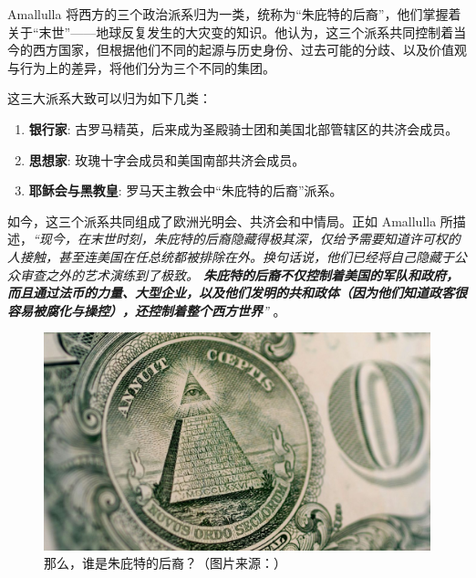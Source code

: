 \documentclass[10pt,twocolumn,letterpaper]{article}
\begin{document}
Amallulla 将西方的三个政治派系归为一类，统称为“朱庇特的后裔”，他们掌握着关于“末世”——地球反复发生的大灾变的知识。他认为，这三个派系共同控制着当今的西方国家，但根据他们不同的起源与历史身份、过去可能的分歧、以及价值观与行为上的差异，将他们分为三个不同的集团。

这三大派系大致可以归为如下几类：

\begin{flushleft}
\begin{enumerate}
    \item \textbf{银行家}: 古罗马精英，后来成为圣殿骑士团和美国北部管辖区的共济会成员。
    \item \textbf{思想家}: 玫瑰十字会成员和美国南部共济会成员。
    \item \textbf{耶稣会与黑教皇}: 罗马天主教会中“朱庇特的后裔”派系。
\end{enumerate}
\end{flushleft}

如今，这三个派系共同组成了欧洲光明会、共济会和中情局。正如 Amallulla 所描述，\textit{“现今，在末世时刻，朱庇特的后裔隐藏得极其深，仅给予需要知道许可权的人接触，甚至连美国在任总统都被排除在外。换句话说，他们已经将自己隐藏于公众审查之外的艺术演练到了极致。 \textbf{朱庇特的后裔不仅控制着美国的军队和政府，而且通过法币的力量、大型企业，以及他们发明的共和政体（因为他们知道政客很容易被腐化与操控），还控制着整个西方世界}”} \cite{33,34}。

\begin{figure}[h]
\begin{center}
   \includegraphics[width=1\linewidth]{illuminati.jpg}

\end{center}
   \caption{那么，谁是朱庇特的后裔？（图片来源：\cite{35}）}
\label{fig:10}
\label{fig:onecol}
\end{figure}
\end{document}
